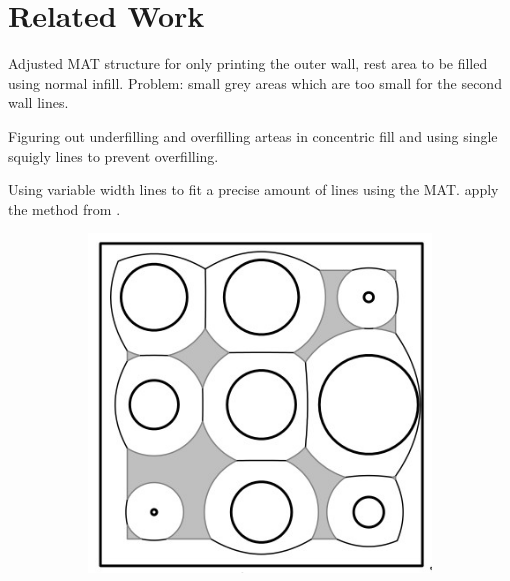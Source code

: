 \section{Related Work}
Adjusted MAT structure for only printing the outer wall, rest area to be filled using normal infill. \cite{Moesen2011}
Problem: small grey areas which are too small for the second wall lines.

Figuring out underfilling and overfilling arteas in concentric fill and using single squigly lines to prevent overfilling. \cite{Jin2017}

Using variable width lines to fit a precise amount of lines using the MAT.
\cite{Ding2016a} apply the method from \cite{kao1998optimal}.

\begin{figure}
\begin{subfigure}{0.45\columnwidth}
\includegraphics[width=\columnwidth]{sources/related_work/moessen.jpg}
\caption{\citeauthor{Moesen2011}}
\label{moessen}
\end{subfigure}
\begin{subfigure}{0.45\columnwidth}

\end{subfigure}
\end{figure}

